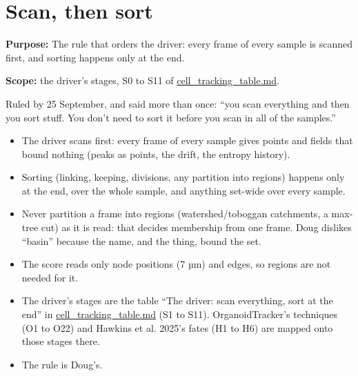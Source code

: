 \chapter{\texorpdfstring{Scan, then sort}{Scan, then sort}}
\label{chap:scan-then-sort}

\textbf{Purpose:} The rule that orders the driver: every frame of every sample is scanned first, and sorting happens only at the end.

\textbf{Scope:} the driver's stages, S0 to S11 of \hyperref[chap:cell-tracking-table]{cell\_\allowbreak{}tracking\_\allowbreak{}table.md}.

Ruled by 25 September, and said more than once: “you scan everything and then you sort stuff. You don't need to sort it before you scan in all of the samples.”

\begin{itemize}
\item The driver scans first: every frame of every sample gives points and fields that bound nothing (peaks as points, the drift, the entropy history).
\item Sorting (linking, keeping, divisions, any partition into regions) happens only at the end, over the whole sample, and anything set-wide over every sample.
\item Never partition a frame into regions (watershed/toboggan catchments, a max-tree cut) as it is read: that decides membership from one frame. Doug dislikes “basin” because the name, and the thing, bound the set.
\item The score reads only node positions (7 µm) and edges, so regions are not needed for it.
\item The driver's stages are the table “The driver: scan everything, sort at the end” in \hyperref[chap:cell-tracking-table]{cell\_\allowbreak{}tracking\_\allowbreak{}table.md} (S1 to S11). OrganoidTracker's techniques (O1 to O22) and Hawkins et al. 2025's fates (H1 to H6) are mapped onto those stages there.
\item The rule is Doug's.
\end{itemize}
